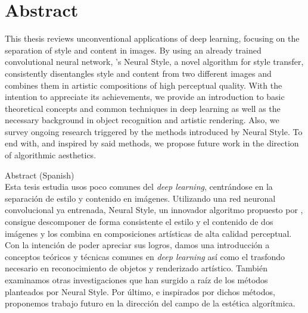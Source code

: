 
\chapter*{Abstract}
\vspace*{-10mm}

This thesis reviews unconventional applications of deep learning, focusing on the separation of style and content in images.
By using an already trained convolutional neural network, \citeauthor{Gatys2015B}'s Neural Style, a novel algorithm for style transfer, consistently disentangles style and content from two different images and combines them in artistic compositions of high perceptual quality.
With the intention to appreciate its achievements, we provide an introduction to basic theoretical concepts and common techniques in deep learning as well as the necessary background in object recognition and artistic rendering.
Also, we survey ongoing research triggered by the methods introduced by Neural Style.
To end with, and inspired by said methods, we propose future work in the direction of algorithmic aesthetics.


\vspace*{20mm}
{Abstract (Spanish)} \\

Esta tesis estudia usos poco comunes del \emph{deep learning}, centrándose en la separación de estilo y contenido en imágenes.
Utilizando una red neuronal convolucional ya entrenada, Neural Style, un innovador algoritmo propuesto por \citeauthor{Gatys2015B}, consigue descomponer de forma consistente el estilo y el contenido de dos imágenes y los combina en composiciones artísticas de alta calidad perceptual.
Con la intención de poder apreciar sus logros, damos una introducción a conceptos teóricos y técnicas comunes en \emph{deep learning} así como el trasfondo necesario en reconocimiento de objetos y renderizado artístico.
También examinamos otras investigaciones que han surgido a raíz de los métodos planteados por Neural Style.
Por último, e inspirados por dichos métodos, proponemos trabajo futuro en la dirección del campo de la estética algorítmica.
